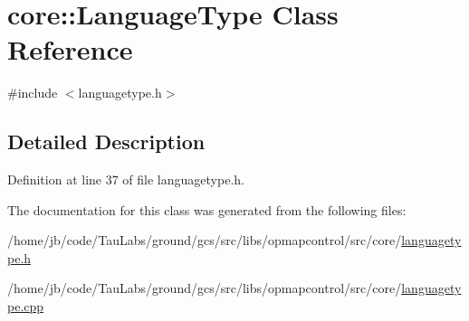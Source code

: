 \hypertarget{classcore_1_1_language_type}{\section{core\-:\-:\-Language\-Type \-Class \-Reference}
\label{classcore_1_1_language_type}
}


{\ttfamily \#include $<$languagetype.\-h$>$}



\subsection{\-Detailed \-Description}


\-Definition at line 37 of file languagetype.\-h.



\-The documentation for this class was generated from the following files\-:\begin{DoxyCompactItemize}
\item 
/home/jb/code/\-Tau\-Labs/ground/gcs/src/libs/opmapcontrol/src/core/\hyperlink{languagetype_8h}{languagetype.\-h}\item 
/home/jb/code/\-Tau\-Labs/ground/gcs/src/libs/opmapcontrol/src/core/\hyperlink{languagetype_8cpp}{languagetype.\-cpp}\end{DoxyCompactItemize}
